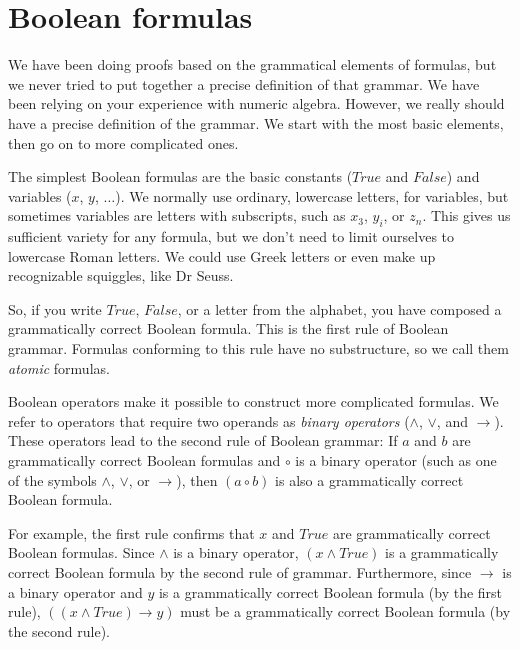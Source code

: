 \section{Boolean formulas}
\label{sec:boolean-formuas}

We have been doing proofs based on the grammatical elements of formulas,
but we never tried to put together a precise definition of that grammar.
We have been relying on your experience with numeric algebra.
However, we really should have a precise definition of the grammar.
We start with the most basic elements,
then go on to more complicated ones.

The simplest Boolean formulas are the basic constants ($True$ and $False$)
and variables ($x$, $y$, $\dots$).
We normally use ordinary, lowercase letters,
for variables,
but sometimes variables are letters with subscripts,
such as $x_3$, $y_i$, or $z_n$.
This gives us sufficient variety for any formula,
but we don't need to limit ourselves to lowercase Roman letters.
We could use Greek letters or
even make up recognizable squiggles, like
Dr Seuss.

So, if you write $True$, $False$, or a letter from the alphabet,
you have composed a grammatically correct Boolean formula.
This is the first rule of Boolean grammar.
Formulas conforming to this rule have no substructure,
so we call them
\emph{atomic} formulas.

Boolean operators make it possible to construct more complicated formulas.
We refer to operators that require two operands as \emph{binary operators }
($\wedge$, $\vee$, and $\rightarrow$).
These operators lead to the second rule of Boolean grammar:
If $a$ and $b$ are grammatically correct Boolean formulas
and $\circ$ is a binary operator
(such as one of the symbols $\wedge$, $\vee$, or $\rightarrow$),
then $(a \circ b)$ is also a grammatically correct Boolean formula.

For example, the first rule confirms that $x$ and $True$ are
grammatically correct Boolean formulas. Since $\wedge$ is a binary operator,
$(x \wedge True)$ is a grammatically correct Boolean formula by the
second rule of grammar. Furthermore, since $\rightarrow$ is a binary operator
and $y$ is a grammatically correct Boolean formula (by the first rule),
$((x \wedge True) \rightarrow y)$ must be a grammatically correct
Boolean formula (by the second rule).

